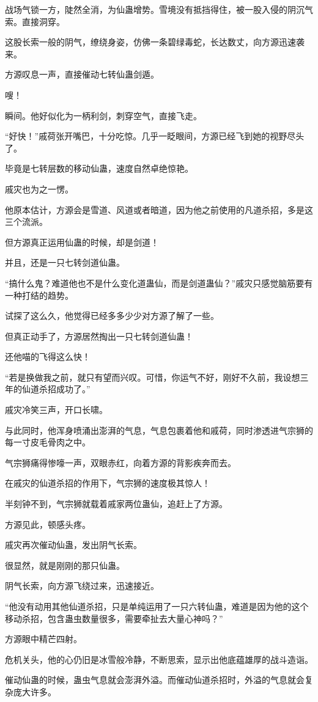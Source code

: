 \begin{this_body}
战场气锁一方，陡然全消，为仙蛊增势。雪境没有抵挡得住，被一股入侵的阴沉气索。直接洞穿。

这股长索一般的阴气，缭绕身姿，仿佛一条碧绿毒蛇，长达数丈，向方源迅速袭来。

方源叹息一声，直接催动七转仙蛊剑遁。

嗖！

瞬间。他好似化为一柄利剑，刺穿空气，直接飞走。

“好快！”戚荷张开嘴巴，十分吃惊。几乎一眨眼间，方源已经飞到她的视野尽头了。

毕竟是七转层数的移动仙蛊，速度自然卓绝惊艳。

戚灾也为之一愣。

他原本估计，方源会是雪道、风道或者暗道，因为他之前使用的凡道杀招，多是这三个流派。

但方源真正运用仙蛊的时候，却是剑道！

并且，还是一只七转剑道仙蛊。

“搞什么鬼？难道他也不是什么变化道蛊仙，而是剑道蛊仙？”戚灾只感觉脑筋要有一种打结的趋势。

试探了这么久，他觉得已经多多少少对方源了解了一些。

但真正动手了，方源居然掏出一只七转剑道仙蛊！

还他喵的飞得这么快！

“若是换做我之前，就只有望而兴叹。可惜，你运气不好，刚好不久前，我设想三年的仙道杀招成功了。”

戚灾冷笑三声，开口长啸。

与此同时，他浑身喷涌出澎湃的气息，气息包裹着他和戚荷，同时渗透进气宗狮的每一寸皮毛骨肉之中。

气宗狮痛得惨嚎一声，双眼赤红，向着方源的背影疾奔而去。

在戚灾的仙道杀招的作用下，气宗狮的速度极其惊人！

半刻钟不到，气宗狮就载着戚家两位蛊仙，追赶上了方源。

方源见此，顿感头疼。

戚灾再次催动仙蛊，发出阴气长索。

很显然，就是刚刚的那只仙蛊。

阴气长索，向方源飞绕过来，迅速接近。

“他没有动用其他仙道杀招，只是单纯运用了一只六转仙蛊，难道是因为他的这个移动杀招，包含蛊虫数量很多，需要牵扯去大量心神吗？”

方源眼中精芒四射。

危机关头，他的心仍旧是冰雪般冷静，不断思索，显示出他底蕴雄厚的战斗造诣。

催动仙蛊的时候，蛊虫气息就会澎湃外溢。而催动仙道杀招时，外溢的气息就会复杂庞大许多。


\end{this_body}
